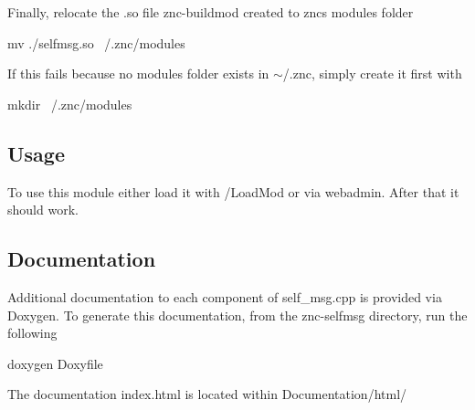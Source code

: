 Finally, relocate the .so file znc-\/buildmod created to znc\textquotesingle{}s modules folder 
\begin{DoxyCode}
mv ./selfmsg.so ~/.znc/modules
\end{DoxyCode}


If this fails because no modules folder exists in $\sim$/.znc, simply create it first with 
\begin{DoxyCode}
mkdir ~/.znc/modules
\end{DoxyCode}


\subsection*{Usage}

To use this module either load it with /\+Load\+Mod or via webadmin. After that it should work.

\subsection*{Documentation}

Additional documentation to each component of self\+\_\+msg.\+cpp is provided via Doxygen. To generate this documentation, from the znc-\/selfmsg directory, run the following 
\begin{DoxyCode}
doxygen Doxyfile
\end{DoxyCode}


The documentation \textquotesingle{}index.\+html\textquotesingle{} is located within Documentation/html/ 